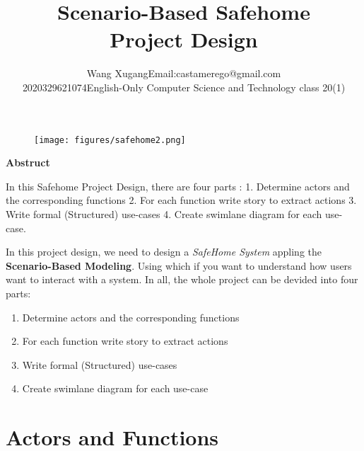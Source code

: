 \documentclass[twoside,11pt]{article}
\makeatletter
\newcommand\studentName{Wang Xugang}
\newcommand\studentEmail{Email:castamerego@gmail.com}
\newcommand\studentNumber{2020329621074}
\newcommand\studentClass{English-Only Computer Science and Technology class 20(1)}
\makeatother
\begin{document}
\title{\Huge Scenario-Based Safehome \\ Project Design}

\author{\name \studentName \email \studentEmail \\
    \studentNumber \class  \studentClass
    \addr
}

\maketitle


\begin{figure}[H]
    \centering
    \texttt{[image: figures/safehome2.png]}
\end{figure}

\textbf{Abstruct} 

In this Safehome Project Design, there are four parts : 1. Determine actors and the corresponding functions 2. For each function write story to extract actions 3. Write formal (Structured) use-cases 4. Create swimlane diagram for each use-case.


\newpage


\begin{center}
    \tableofcontents
\end{center}
\thispagestyle{empty}
\newpage


In this project design, we need to design a \emph{SafeHome System} appling the \textbf{Scenario-Based Modeling}. Using which if you want to understand how users want to interact with a system\cite{roger2015software}. In all, the whole project can be devided into four parts:
\begin{enumerate}
    \item Determine actors and the corresponding functions
    \item For each function write story to extract actions
    \item Write formal (Structured) use-cases
    \item Create swimlane diagram for each use-case
\end{enumerate}


\section{Actors and Functions}
\end{document}

